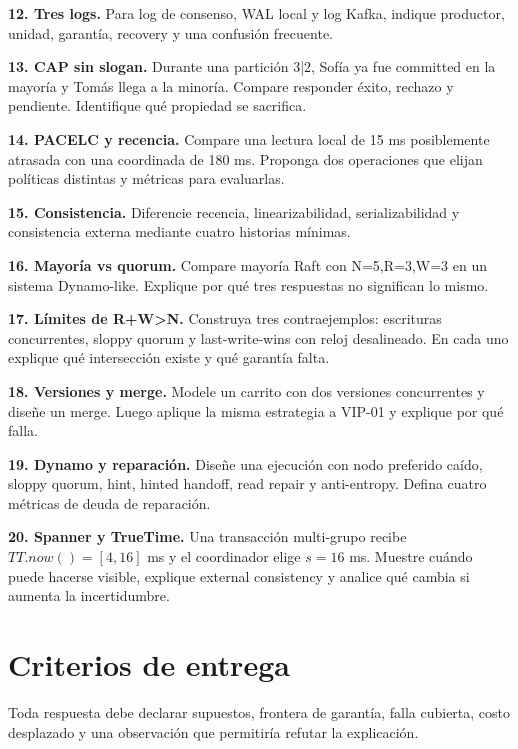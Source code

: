 \documentclass[variant=guia,cover=institutional,mode=screen]{ua-engineering-v6-article}
\begin{document}
\begin{uaexercise}
\textbf{12. Tres logs.} Para log de consenso, WAL local y log Kafka, indique productor, unidad, garantía, recovery y una confusión frecuente.
\end{uaexercise}

\begin{uaexercise}
\textbf{13. CAP sin slogan.} Durante una partición 3|2, Sofía ya fue committed en la mayoría y Tomás llega a la minoría. Compare responder éxito, rechazo y pendiente. Identifique qué propiedad se sacrifica.
\end{uaexercise}

\begin{uaexercise}
\textbf{14. PACELC y recencia.} Compare una lectura local de 15 ms posiblemente atrasada con una coordinada de 180 ms. Proponga dos operaciones que elijan políticas distintas y métricas para evaluarlas.
\end{uaexercise}

\begin{uaexercise}
\textbf{15. Consistencia.} Diferencie recencia, linearizabilidad, serializabilidad y consistencia externa mediante cuatro historias mínimas.
\end{uaexercise}

\begin{uaexercise}
\textbf{16. Mayoría vs quorum.} Compare mayoría Raft con N=5,R=3,W=3 en un sistema Dynamo-like. Explique por qué tres respuestas no significan lo mismo.
\end{uaexercise}

\begin{uaexercise}
\textbf{17. Límites de R+W>N.} Construya tres contraejemplos: escrituras concurrentes, sloppy quorum y last-write-wins con reloj desalineado. En cada uno explique qué intersección existe y qué garantía falta.
\end{uaexercise}

\begin{uaexercise}
\textbf{18. Versiones y merge.} Modele un carrito con dos versiones concurrentes y diseñe un merge. Luego aplique la misma estrategia a VIP-01 y explique por qué falla.
\end{uaexercise}

\begin{uaexercise}
\textbf{19. Dynamo y reparación.} Diseñe una ejecución con nodo preferido caído, sloppy quorum, hint, hinted handoff, read repair y anti-entropy. Defina cuatro métricas de deuda de reparación.
\end{uaexercise}

\begin{uaexercise}
\textbf{20. Spanner y TrueTime.} Una transacción multi-grupo recibe $TT.now()=[4,16]$ ms y el coordinador elige $s=16$ ms. Muestre cuándo puede hacerse visible, explique external consistency y analice qué cambia si aumenta la incertidumbre.
\end{uaexercise}
\section{Criterios de entrega}
Toda respuesta debe declarar supuestos, frontera de garantía, falla cubierta, costo desplazado y una observación que permitiría refutar la explicación.
\end{document}

